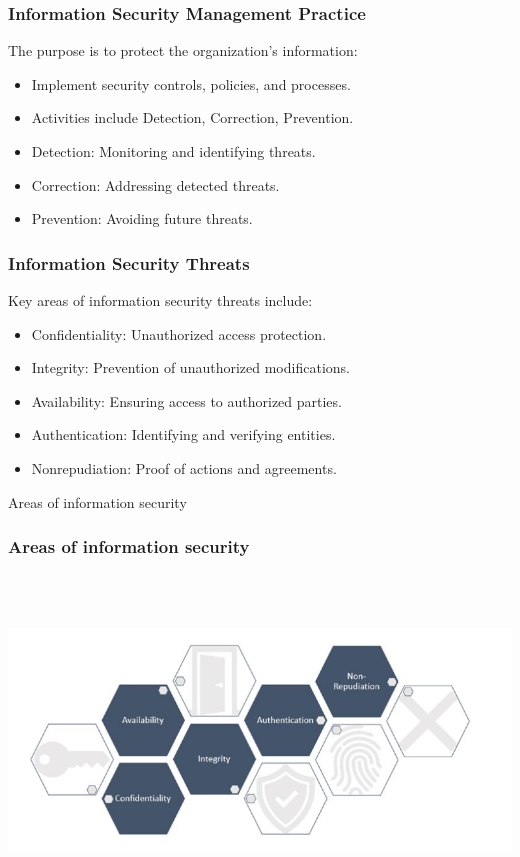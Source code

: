 \documentclass[aspectratio=169, table]{beamer}
\begin{document}
\begin{frame}
\frametitle{Information Security Management Practice}

The purpose is to protect the organization's information:
\begin{itemize}
	\item Implement security controls, policies, and processes.
	\item Activities include Detection, Correction, Prevention.
	\item Detection: Monitoring and identifying threats.
	\item Correction: Addressing detected threats.
	\item Prevention: Avoiding future threats.
\end{itemize}

\end{frame}

\begin{frame}
\frametitle{Information Security Threats}

Key areas of information security threats include:
\begin{itemize}
	\item Confidentiality: Unauthorized access protection.
	\item Integrity: Prevention of unauthorized modifications.
	\item Availability: Ensuring access to authorized parties.
	\item Authentication: Identifying and verifying entities.
	\item Nonrepudiation: Proof of actions and agreements.
\end{itemize}

\end{frame}

\begin{frame}{Areas of information security} 	 \frametitle{ Areas of information security} \begin{center} 	\includegraphics[width=0.7\linewidth]{images/image-01.png} \end{center} \end{frame}
\end{document}
